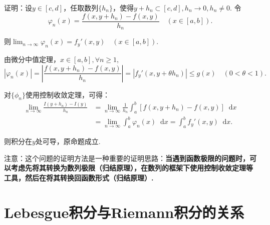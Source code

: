 \documentclass[bwprint, withoutpreface]{cumcmthesis}
\newcommand*{\dif}{\mathop{}\!\mathrm{d}}
\begin{document}
证明：设$y \in [c, d]$，任取数列$\{h_n\}$，使得$y + h_n \subset [c, d], h_n \to 0, h_n \neq 0$. 令
\begin{equation*}
	\varphi_n(x) = \frac{f(x, y + h_n) - f(x, y)}{h_n} \quad (x \in [a, b]).
\end{equation*}

则$\lim_{n \to \infty} \varphi_n(x) = {f_y}'(x, y) \quad (x \in [a, b])$.

由微分中值定理，$x \in [a, b], \forall n \geqslant 1$, 
\begin{equation*}
	|\varphi_n(x)| = |\frac{f(x, y + h_n) - f(x, y)}{h_n}| = |{f_y}'(x, y + \theta h_n)| \leqslant g(x) \quad (0 < \theta < 1).
\end{equation*}

对$\{\phi_n\}$使用控制收敛定理，可得：
\begin{align*}
	\lim_{n \to \infty}{\frac{I(y + h_n) - I(y)}{h_n}} & = \lim_{n \to \infty} \frac{1}{h_n}{\int_{a}^{b}{[f(x, y + h_n) - f(x, y)] \dif x}} \\
													   & = \lim_{n \to \infty} {\int_{a}^{b} \varphi_n(x) \dif x} = \int_{a}^{b}{f_y}'(x, y) \dif x.
\end{align*}

则积分在$y$处可导，原命题成立.

注意：这个问题的证明方法是一种重要的证明思路：\textbf{当遇到函数极限的问题时，可以考虑先将其转换为数列极限（归结原理），在数列的框架下使用控制收敛定理等工具，然后在将其转换回函数形式（归结原理）.}

\section{Lebesgue积分与Riemann积分的关系}
\end{document}
